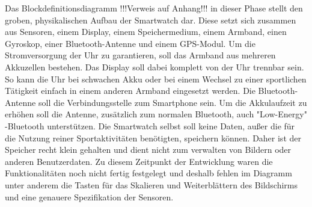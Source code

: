 Das Blockdefinitionsdiagramm !!!Verweis auf Anhang!!! in dieser Phase stellt den groben, physikalischen Aufbau der Smartwatch dar. Diese setzt sich zusammen aus Sensoren, einem Display, einem Speichermedium, einem Armband, einen Gyroskop, einer Bluetooth-Antenne und einem GPS-Modul. Um die Stromversorgung der Uhr zu garantieren, soll das Armband aus mehreren Akkuzellen bestehen. Das Display soll dabei komplett von der Uhr trennbar sein. So kann die Uhr bei schwachen Akku oder bei einem Wechsel zu einer sportlichen Tätigkeit einfach in einem anderen Armband eingesetzt werden. Die Bluetooth-Antenne soll die Verbindungsstelle zum Smartphone sein. Um die Akkulaufzeit zu erhöhen soll die Antenne, zusätzlich zum normalen Bluetooth, auch "Low-Energy" -Bluetooth unterstützen. Die Smartwatch selbst soll keine Daten, außer die für die Nutzung reiner Sportaktivitäten benötigten, speichern können. Daher ist der Speicher recht klein gehalten und dient nicht zum verwalten von Bildern oder anderen Benutzerdaten.
Zu diesem Zeitpunkt der Entwicklung waren die Funktionalitäten noch nicht fertig festgelegt und deshalb fehlen im Diagramm unter anderem die Tasten für das Skalieren und Weiterblättern des Bildschirms und eine genauere Spezifikation der Sensoren.

